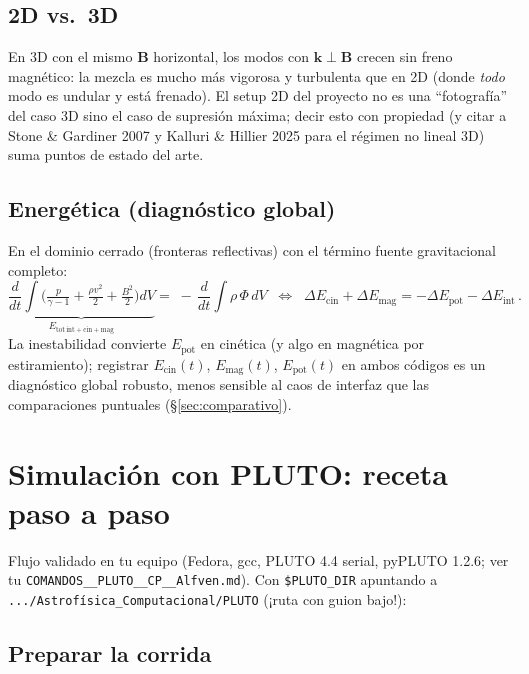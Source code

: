 \documentclass[11pt,a4paper]{article}
\newcommand{\B}{\mathbf{B}}
\newcommand{\code}[1]{\texttt{#1}}
\begin{document}
\subsection{2D vs.\ 3D}

En 3D con el mismo $\B$ horizontal, los modos con $\mathbf{k}\perp\B$ crecen sin freno
magnético: la mezcla es mucho más vigorosa y turbulenta que en 2D (donde \emph{todo} modo es
undular y está frenado). El setup 2D del proyecto no es una ``fotografía'' del caso 3D sino
el caso de supresión máxima; decir esto con propiedad (y citar a Stone \& Gardiner 2007 y
Kalluri \& Hillier 2025 para el régimen no lineal 3D) suma puntos de estado del arte.

\subsection{Energética (diagnóstico global)}

En el dominio cerrado (fronteras reflectivas) con el término fuente gravitacional completo:
\begin{equation}
\underbrace{\frac{d}{dt}\int\!\Big(\tfrac{p}{\gamma-1}+\tfrac{\rho v^2}{2}+\tfrac{B^2}{2}\Big)dV}_{E_\mathrm{tot\,int+cin+mag}}
=\;-\,\frac{d}{dt}\int \rho\,\Phi\,dV
\;\;\Longleftrightarrow\;\;
\Delta E_\mathrm{cin}+\Delta E_\mathrm{mag}= -\Delta E_\mathrm{pot}-\Delta E_\mathrm{int}\,.
\end{equation}
La inestabilidad convierte $E_\mathrm{pot}$ en cinética (y algo en magnética por
estiramiento); registrar $E_\mathrm{cin}(t)$, $E_\mathrm{mag}(t)$, $E_\mathrm{pot}(t)$ en
ambos códigos es un diagnóstico global robusto, menos sensible al caos de interfaz que las
comparaciones puntuales (§\ref{sec:comparativo}).

\section{Simulación con PLUTO: receta paso a paso}
\label{sec:pluto}

Flujo validado en tu equipo (Fedora, gcc, PLUTO 4.4 serial, pyPLUTO 1.2.6; ver tu
\code{COMANDOS\_\allowbreak{}\_\allowbreak PLUTO\_\allowbreak{}\_\allowbreak CP\_\allowbreak{}\_\allowbreak Alfven.md}).
Con \code{\$PLUTO\_DIR} apuntando a
\code{.../Astrof\'isica\_Computacional/PLUTO} (¡ruta con guion bajo!):

\subsection{Preparar la corrida}
\end{document}
